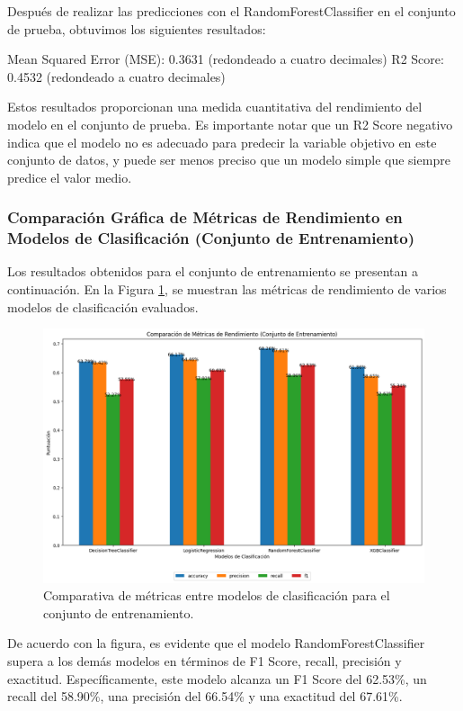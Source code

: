 Después de realizar las predicciones con el RandomForestClassifier en el conjunto de prueba, obtuvimos los siguientes resultados:

Mean Squared Error (MSE): 0.3631 (redondeado a cuatro decimales)
R2 Score: 0.4532 (redondeado a cuatro decimales)

Estos resultados proporcionan una medida cuantitativa del rendimiento del modelo en el conjunto de prueba. Es importante notar que un R2 Score negativo indica que el modelo no es adecuado para predecir la variable objetivo en este conjunto de datos, y puede ser menos preciso que un modelo simple que siempre predice el valor medio.


\subsubsection{Comparación Gráfica de Métricas de Rendimiento en Modelos de Clasificación (Conjunto de Entrenamiento)}

Los resultados obtenidos para el conjunto de entrenamiento se presentan a continuación. En la Figura \ref{fig:metricas_clasificacion}, se muestran las métricas de rendimiento de varios modelos de clasificación evaluados.

\begin{figure}[H]
\centering
\includegraphics[width=1\textwidth]{img/compara_algoritmos/metricasEntreModelosClasificacion.png}
\caption{Comparativa de métricas entre modelos de clasificación para el conjunto de entrenamiento.}
\label{fig:metricas_clasificacion}
\end{figure}

De acuerdo con la figura, es evidente que el modelo RandomForestClassifier supera a los demás modelos en términos de F1 Score, recall, precisión y exactitud. Específicamente, este modelo alcanza un F1 Score del 62.53\%, un recall del 58.90\%, una precisión del 66.54\% y una exactitud del 67.61\%.

